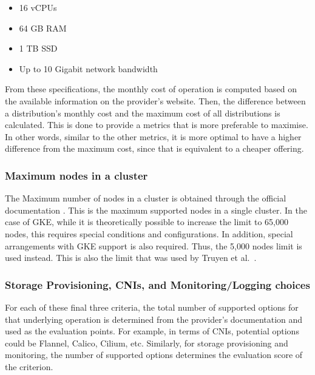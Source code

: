 \begin{itemize}
\tightlist
\item
  16 vCPUs
\item
  64 GB RAM
\item
  1 TB SSD
\item
  Up to 10 Gigabit network bandwidth
\end{itemize}

From these specifications, the monthly cost of operation is computed
based on the available information on the provider's website. Then, the difference between a distribution's monthly cost and the maximum cost of all distributions is calculated. This is done to provide a metrics that is more preferable to maximise. In other words, similar to the other metrics, it is more optimal to have a higher difference from the maximum cost, since that is equivalent to a cheaper offering.

\subsubsection{Maximum nodes in a cluster}\label{maximum-nodes-in-a-cluster}

The Maximum number of nodes in a cluster is obtained through the
official documentation
\cite{Chapter4Planninga,KnownLimitsService,nickomangLimitsResourcesSKUs2024,QuotasLimitsGoogle}.
This is the maximum supported nodes in a single cluster. In the case of
GKE, while it is theoretically possible to increase the limit to 65,000
nodes, this requires special conditions and configurations. In addition,
special arrangements with GKE support is also required. Thus, the 5,000
nodes limit is used instead. This is also the limit that was used by
Truyen et al.~\cite{truyenManagingFeatureCompatibility2020}.

\subsubsection{Storage Provisioning, CNIs, and Monitoring/Logging choices}\label{storage-provisioning-cnis-and-monitoring-and-logging}

For each of these final three criteria, the total number of supported options for that
underlying operation is determined from the provider's documentation and used as the evaluation points. For example, in terms of CNIs, potential options could be Flannel, Calico, Cilium, etc. Similarly, for storage provisioning and monitoring, the number of supported options determines the evaluation score of the criterion.



